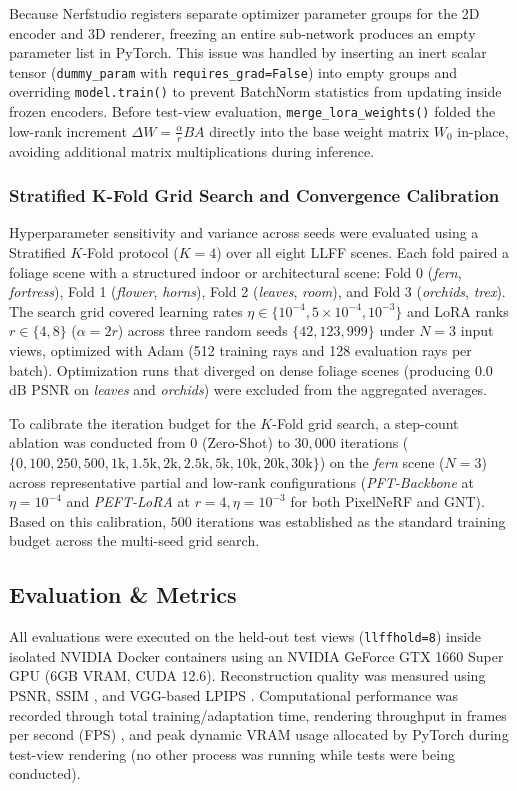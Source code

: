 Because Nerfstudio registers separate optimizer parameter groups for the 2D encoder and 3D renderer, freezing an entire sub-network produces an empty parameter list in PyTorch. This issue was handled by inserting an inert scalar tensor (\texttt{dummy\_param} with \texttt{requires\_grad=False}) into empty groups and overriding \texttt{model.train()} to prevent BatchNorm statistics from updating inside frozen encoders. Before test-view evaluation, \texttt{merge\_lora\_weights()} folded the low-rank increment $\Delta W = \frac{\alpha}{r}BA$ directly into the base weight matrix $W_0$ in-place, avoiding additional matrix multiplications during inference.

\subsubsection{Stratified K-Fold Grid Search and Convergence Calibration}
Hyperparameter sensitivity and variance across seeds were evaluated using a Stratified $K$-Fold protocol ($K=4$) over all eight LLFF scenes. Each fold paired a foliage scene with a structured indoor or architectural scene: Fold 0 (\textit{fern}, \textit{fortress}), Fold 1 (\textit{flower}, \textit{horns}), Fold 2 (\textit{leaves}, \textit{room}), and Fold 3 (\textit{orchids}, \textit{trex}). The search grid covered learning rates $\eta \in \{10^{-4}, 5\times 10^{-4}, 10^{-3}\}$ and LoRA ranks $r \in \{4, 8\}$ ($\alpha = 2r$) across three random seeds $\{42, 123, 999\}$ under $N=3$ input views, optimized with Adam (512 training rays and 128 evaluation rays per batch). Optimization runs that diverged on dense foliage scenes (producing $0.0$ dB PSNR on \textit{leaves} and \textit{orchids}) were excluded from the aggregated averages.

To calibrate the iteration budget for the $K$-Fold grid search, a step-count ablation was conducted from $0$ (Zero-Shot) to $30,000$ iterations ($\{0, 100, 250, 500, 1\text{k}, 1.5\text{k}, 2\text{k}, 2.5\text{k}, 5\text{k}, 10\text{k}, 20\text{k}, 30\text{k}\}$) on the \textit{fern} scene ($N=3$) across representative partial and low-rank configurations (\textit{PFT-Backbone} at $\eta=10^{-4}$ and \textit{PEFT-LoRA} at $r=4, \eta=10^{-3}$ for both PixelNeRF and GNT). Based on this calibration, $500$ iterations was established as the standard training budget across the multi-seed grid search.

\subsection{Evaluation \& Metrics}
\label{sec:metrics}
All evaluations were executed on the held-out test views (\texttt{llffhold=8}) inside isolated NVIDIA Docker containers using an NVIDIA GeForce GTX 1660 Super GPU (6GB VRAM, CUDA 12.6). Reconstruction quality was measured using PSNR, SSIM \cite{wang2004image}, and VGG-based LPIPS \cite{zhang2018unreasonable, niemeyer2022regnerf}. Computational performance was recorded through total training/adaptation time, rendering throughput in frames per second (FPS) \cite{kulhanek2025nerfbaselinesconsistentreproducibleevaluation}, and peak dynamic VRAM usage allocated by PyTorch during test-view rendering (no other process was running while tests were being conducted).
